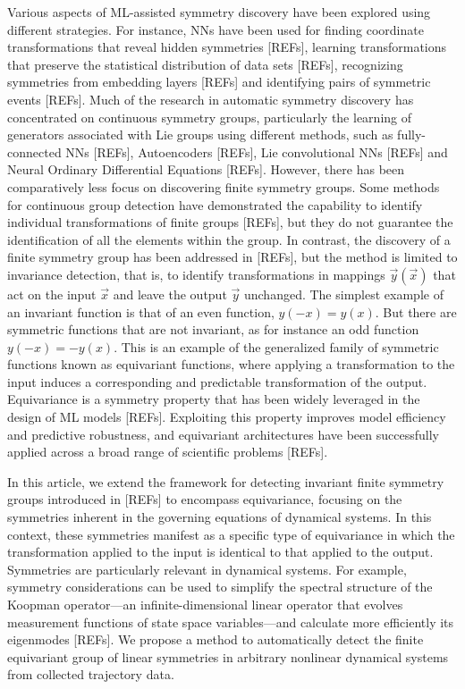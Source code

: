 Various aspects of ML-assisted symmetry discovery have been explored using different strategies. For instance, NNs have been used for finding coordinate transformations that reveal hidden symmetries [REFs], learning transformations that preserve the statistical distribution of data sets [REFs], recognizing symmetries from embedding layers [REFs] and identifying pairs of symmetric events [REFs]. Much of the research in automatic symmetry discovery has concentrated on continuous symmetry groups, particularly the learning of generators associated with Lie groups using different methods, such as fully-connected NNs [REFs], Autoencoders [REFs], Lie convolutional NNs [REFs] and Neural Ordinary Differential Equations [REFs]. However, there has been comparatively less focus on discovering finite symmetry groups. Some methods for continuous group detection have demonstrated the capability to identify individual transformations of finite groups [REFs], but they do not guarantee the identification of all the elements within the group. In contrast, the discovery of a finite symmetry group has been addressed in [REFs], but the method is limited to invariance detection, that is, to identify transformations in mappings $\vec{y} (\vec{x})$ that act on the input $\vec{x}$ and leave the output $\vec{y}$ unchanged. The simplest example of an invariant function is that of an even function, $y(-x) = y(x)$. But there are symmetric functions that are not invariant, as for instance an odd function $y(-x) = -y(x)$. This is an example of the generalized family of symmetric functions known as equivariant functions, where applying a transformation to the input induces a corresponding and predictable transformation of the output. Equivariance is a symmetry property that has been widely leveraged in the design of ML models [REFs]. Exploiting this property improves model efficiency and predictive robustness, and equivariant architectures have been successfully applied across a broad range of scientific problems [REFs].

In this article, we extend the framework for detecting invariant finite symmetry groups introduced in [REFs] to encompass equivariance, focusing on the symmetries inherent in the governing equations of dynamical systems. In this context, these symmetries manifest as a specific type of equivariance in which the transformation applied to the input is identical to that applied to the output. Symmetries are particularly relevant in dynamical systems. For example, symmetry considerations can be used to simplify the spectral structure of the Koopman operator—an infinite-dimensional linear operator that evolves measurement functions of state space variables—and calculate more efficiently its eigenmodes [REFs]. We propose a method to automatically detect the finite equivariant group of linear symmetries in arbitrary nonlinear dynamical systems from collected trajectory data.


